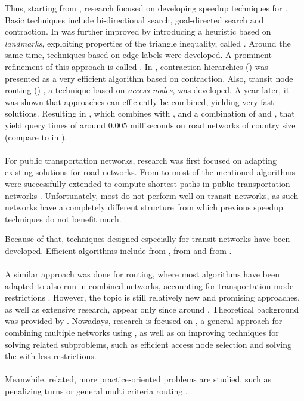 	Thus, starting from , research focused on developing speedup techniques for \dijkstra. Basic techniques include
	bi-directional search, goal-directed search and contraction. In  \astar was further
	improved by introducing a heuristic based on \textit{landmarks}, exploiting properties of the triangle inequality,
	called \alt {}. Around the same time, techniques based on edge labels were developed. A prominent refinement of this
	approach is called \arcFlags {}. In , contraction hierarchies (\ch)  was presented as a
	very efficient algorithm based on contraction. Also, transit node routing (\tnr) , a technique based on \textit{access nodes},
	was developed. A year later, it was shown that approaches can efficiently be combined, yielding very fast solutions.
	Resulting in \chase {}, which combines \ch with \arcFlags, and a combination of \tnr and \arcFlags, that yield query times
	of around $0.005$ milliseconds on road networks of country size (compare to 
	in ).\\\\
	For public transportation networks, research was first focused on adapting existing solutions for road networks.
	From  to  most of the mentioned algorithms were successfully extended to compute shortest
	paths in public transportation networks .
	Unfortunately, most do not perform well on transit networks, as such networks have a completely different structure from which
	previous speedup techniques do not benefit much.
	
	Because of that, techniques designed especially for transit networks have been developed. Efficient algorithms include \transferPatterns
	 from , \raptor {} from  and \csa {} from .\\\\
	A similar approach was done for \multiModal routing, where most algorithms have been adapted to also run in combined networks,
	accounting for transportation mode restrictions .
	However, the topic is still relatively new and promising approaches, as well as extensive research, appear only since around
	. Theoretical background was provided by .
	Nowadays, research is focused on \anr {}, a general approach for combining
	multiple networks using , as well as on improving techniques for solving related subproblems, such as
	efficient access node selection and solving the \lcspp {} with less restrictions.\\\\
	Meanwhile, related, more practice-oriented problems are studied, such as penalizing turns 
	or general multi criteria routing .

